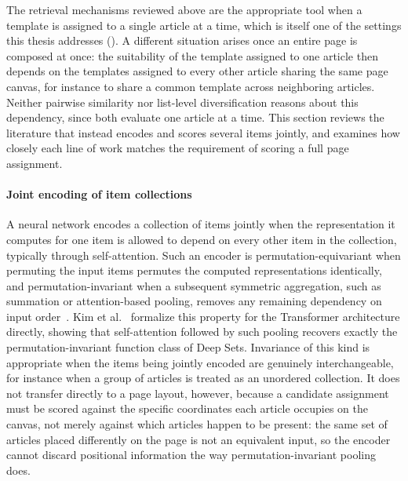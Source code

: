 The retrieval mechanisms reviewed above are the appropriate tool when a template is assigned to a single article at a time, which is itself one of the settings this thesis addresses (). A different situation arises once an entire page is composed at once: the suitability of the template assigned to one article then depends on the templates assigned to every other article sharing the same page canvas, for instance to share a common template across neighboring articles. Neither pairwise similarity nor list-level diversification reasons about this dependency, since both evaluate one article at a time. This section reviews the literature that instead encodes and scores several items jointly, and examines how closely each line of work matches the requirement of scoring a full page assignment.

\paragraph*{Joint encoding of item collections}
A neural network encodes a collection of items jointly when the representation it computes for one item is allowed to depend on every other item in the collection, typically through self-attention. Such an encoder is permutation-equivariant when permuting the input items permutes the computed representations identically, and permutation-invariant when a subsequent symmetric aggregation, such as summation or attention-based pooling, removes any remaining dependency on input order~\cite{xie-set-function-survey-2025}. Kim et al.~\cite{kim-transformers-deepsets-2021} formalize this property for the Transformer architecture directly, showing that self-attention followed by such pooling recovers exactly the permutation-invariant function class of Deep Sets. Invariance of this kind is appropriate when the items being jointly encoded are genuinely interchangeable, for instance when a group of articles is treated as an unordered collection. It does not transfer directly to a page layout, however, because a candidate assignment must be scored against the specific coordinates each article occupies on the canvas, not merely against which articles happen to be present: the same set of articles placed differently on the page is not an equivalent input, so the encoder cannot discard positional information the way permutation-invariant pooling does.

